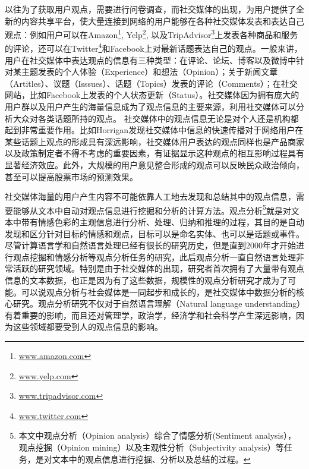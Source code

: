 以往为了获取用户观点，需要进行问卷调查，而社交媒体的出现，为用户提供了全新的内容共享平台，使大量连接到网络的用户能够在各种社交媒体发表和表达自己观点：例如用户可以在Amazon\footnote{\url{www.amazon.com}}, Yelp\footnote{\url{www.yelp.com}}, 以及TripAdvisor\footnote{\url{www.tripadvisor.com}}上发表各种商品和服务的评论，还可以在Twitter\footnote{\url{www.twitter.com}}和Facebook上对最新话题表达自己的观点。一般来讲，用户在社交媒体中表达观点的信息有三种类型：在评论、论坛、博客以及微博中针对某主题发表的个人体验（Experience）和想法（Opinion）；关于新闻文章（Artitles）、议题（Isssues）、话题（Topics）发表的评论（Comments）；在社交网站，比如Facebook上发表的个人状态更新（Status）。社交媒体因为拥有庞大的用户群以及用户产生的海量信息成为了观点信息的主要来源，利用社交媒体可以分析大众对各类话题所持的观点。
社交媒体中的观点信息无论是对个人还是机构都起到非常重要作用。比如Horrigan发现社交媒体中信息的快速传播对于网络用户在某些话题上观点的形成具有深远影响，社交媒体用户表达的观点同样也是产品商家以及政策制定者不得不考虑的重要因素，有证据显示这种观点的相互影响过程具有显著经济效应。此外，大规模的用户意见整合形成的观点可以反映民众政治倾向，甚至可以提高股票市场的预测效果。

社交媒体海量的用户产生内容不可能依靠人工地去发现和总结其中的观点信息，需要能够从文本中自动对观点信息进行挖掘和分析的计算方法。观点分析\footnote{本文中观点分析（Opinion analysis）综合了情感分析(Sentiment analysis），观点挖掘（Opinion mining）以及主观性分析（Subjectivity analysis）等任务，是对文本中的观点信息进行挖掘、分析以及总结的过程。}就是对文本中带有情感色彩的主观信息进行分析、处理、归纳和推理的过程，其目的是自动发现和区分针对目标的情感和观点，目标可以是命名实体、也可以是话题或事件。
尽管计算语言学和自然语言处理已经有很长的研究历史，但是直到2000年才开始进行观点挖掘和情感分析等观点分析任务的研究，此后观点分析一直自然语言处理非常活跃的研究领域。特别是由于社交媒体的出现，研究者首次拥有了大量带有观点信息的文本数据，也正是因为有了这些数据，规模性的观点分析研究才成为了可能。可以说观点分析与社会媒体是一同起步和成长的，是社交媒体中数据分析的核心研究。观点分析研究不仅对于自然语言理解（Natural language understanding）有着重要的影响，而且还对管理学，政治学，经济学和社会科学产生深远影响，因为这些领域都要受到人的观点信息的影响。

%
%

